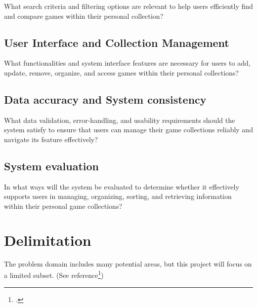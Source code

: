 \documentclass[11pt]{article}
\begin{document}
What search criteria and filtering options are relevant to help users efficiently find and compare games within their personal collection?

\subsection{User Interface and Collection Management}

What functionalities and system interface features are necessary for users to add, update, remove, organize, and access games within their personal collections?


\subsection{Data accuracy and System consistency}

What data validation, error-handling, and usability requirements should the system satisfy to ensure that users can manage their game collections reliably and navigate its feature effectively?

\subsection {System evaluation}

In what ways will the system be evaluated to determine whether it effectively supports users in managing, organizing, sorting, and retrieving information within their personal game collections?










\newpage
\section{Delimitation}

The problem domain includes many potential areas, but this project will focus on a limited subset. (See reference\footcite{project})
\end{document}
